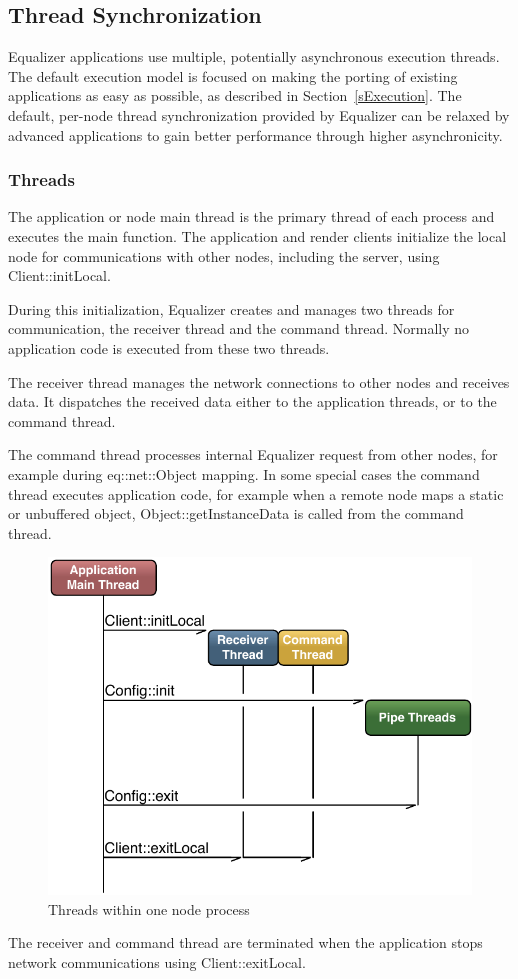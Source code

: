\documentclass[10pt,a4]{scrartcl}
\newcommand{\sref}[1]{Section~\ref{#1}}
\begin{document}
\subsection{\label{sThreads}Thread Synchronization}

Equalizer applications use multiple, potentially asynchronous execution
threads. The default execution model is focused on making the porting of
existing applications as easy as possible, as described in
\sref{sExecution}. The default, per-node thread synchronization provided
by Equalizer can be relaxed by advanced applications to gain better
performance through higher asynchronicity.

\subsubsection{Threads}

The application or node main thread is the primary thread of each
process and executes the \textsf{main} function. The application and
render clients initialize the local node for communications with other
nodes, including the server, using \textsf{Client::initLocal}.

During this initialization, Equalizer creates and manages two threads
for communication, the receiver thread and the command thread. Normally
no application code is executed from these two threads.

The receiver thread manages the network connections to other nodes and
receives data. It dispatches the received data either to the application
threads, or to the command thread.

The command thread processes internal Equalizer request from other
nodes, for example during \textsf{eq::net::Object} mapping. In some
special cases the command thread executes application code, for example
when a remote node maps a static or unbuffered object,
\textsf{Object::getInstanceData} is called from the command thread.

\begin{figure}
  \includegraphics[width=.618\textwidth]{images/threads.pdf}
  {\caption{\small\label{fThreads}Threads within one node process}}
\end{figure}
The receiver and command thread are terminated when the application
stops network communications using \textsf{Client::exitLocal}.
\end{document}
